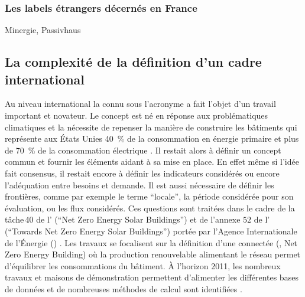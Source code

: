 \subsubsection{Les labels étrangers décernés en France} %
\label{ssub:les_labels_etrangers_decernes_en_france}

Minergie, Passivhaus




\subsection{La complexité de la définition d’un cadre international} %
\label{sub:la_definition_d_un_cadre_international}
Au niveau international la  connu sous l’acronyme  a fait l’objet d’un
travail important et novateur.
Le concept est né en réponse aux problématiques climatiques et la nécessite
de repenser la manière de construire les bâtiments qui représente aux États Unies
\SI{40}{\percent} de la consommation en énergie primaire et plus de \SI{70}{\percent}
de la consommation électrique \parencite{Torcellini2006a}. Il
restait alors à définir un concept commun et fournir les éléments aidant à sa mise en
place. En effet même si l’idée fait consensus, il restait encore à définir les indicateurs
considérés ou encore l’adéquation entre besoins et demande.
Il est aussi nécessaire de définir les frontières, comme par exemple le terme \enquote{locale},
la période considérée pour son évaluation, ou les flux considérés. Ces questions sont traitées
dans le cadre de la tâche\,40 de l’ (\enquote{Net Zero Energy Solar Buildings}) et de l’annexe $52$ de
l’ (\enquote{Towards Net Zero Energy Solar Buildings}) portée par l’Agence Internationale
de l’Énergie () . Les travaux se focalisent
sur la définition d’une  connectée (, Net Zero Energy Building) où
la production renouvelable alimentant le réseau permet d’équilibrer les consommations du bâtiment.
À l’horizon 2011, les nombreux travaux et maisons de démonstration permettent d’alimenter
les différentes bases de données et de nombreuses méthodes de calcul sont identifiées
\parencite{Marszal2011971}.


